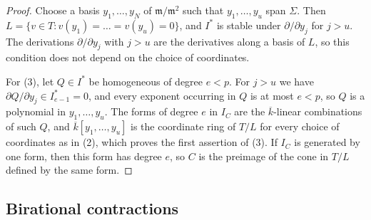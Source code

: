 \begin{proof}
Choose a basis $y_1,\dots,y_N$ of $\mathfrak m/\mathfrak m^2$ such that $y_1,\dots,y_u$ span $\Sigma$.
Then $L = \{v\in T : v(y_1) = \dots = v(y_u) = 0\}$, and $I^*$ is stable under $\partial/\partial y_j$ for $j>u$.
The derivations $\partial/\partial y_j$ with $j>u$ are the derivatives along a basis of $L$, so this condition does not depend on the choice of coordinates.

For (3), let $Q\in I^*$ be homogeneous of degree $e<p$.
For $j>u$ we have $\partial Q/\partial y_j\in I^*_{e-1} = 0$, and every exponent occurring in $Q$ is at most $e<p$, so $Q$ is a polynomial in $y_1,\dots,y_u$.
The forms of degree $e$ in $I_C$ are the $\overline k$-linear combinations of such $Q$, and $\overline k[y_1,\dots,y_u]$ is the coordinate ring of $T/L$ for every choice of coordinates as in (2), which proves the first assertion of (3).
If $I_C$ is generated by one form, then this form has degree $e$, so $C$ is the preimage of the cone in $T/L$ defined by the same form.
\end{proof}


\subsection{Birational contractions}\label{subsec:birational-surfaces}

